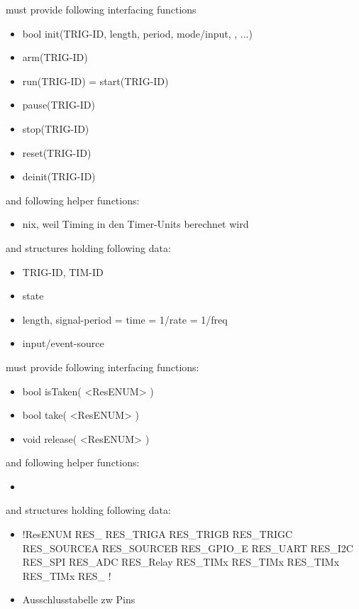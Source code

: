 	{	must provide following interfacing functions 
		\begin{itemize} \setlength\itemsep{1px}
		\item bool init(TRIG-ID, length, period, mode/input, , ...)
		\item arm(TRIG-ID)
		\item run(TRIG-ID) = start(TRIG-ID)
		\item pause(TRIG-ID)
		\item stop(TRIG-ID)
		\item reset(TRIG-ID)
		\item deinit(TRIG-ID)
		\end{itemize}

		and following helper functions:
		\begin{itemize} \setlength\itemsep{1px}
		\item nix, weil Timing in den Timer-Units berechnet wird
		\end{itemize}

		and structures holding following data:
		\begin{itemize} \setlength\itemsep{1px}
		\item TRIG-ID, TIM-ID
		\item state
		\item length, signal-period = time = 1/rate = 1/freq
		\item input/event-source
		\end{itemize}
	}

	{	must provide following interfacing functions:
		\begin{itemize} \setlength\itemsep{1px}
		\item bool isTaken( <ResENUM> )
		\item bool take( <ResENUM> )
		\item void release( <ResENUM> )
		\end{itemize}
		and following helper functions:
		\begin{itemize} \setlength\itemsep{1px}
		\item 
		\end{itemize}

		and structures holding following data:
		\begin{itemize} \setlength\itemsep{1px}
		\item 	\lstC !ResENUM	{ RES_ 	RES_TRIGA 	RES_TRIGB 	RES_TRIGC 	RES_SOURCEA 	RES_SOURCEB 	RES_GPIO_E 	RES_UART 	
					  RES_I2C 	RES_SPI 	RES_ADC 	RES_Relay 	RES_TIMx 	RES_TIMx 	RES_TIMx 	RES_TIMx	RES_		}!
		\item 			Ausschlusstabelle zw Pins
		\end{itemize}
	}
			
